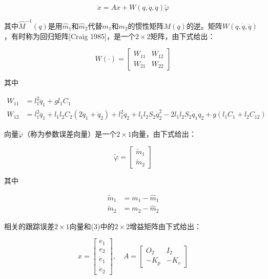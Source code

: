 \documentclass[12pt,a4paper]{ctexart}
\begin{document}
\begin{equation}
\dot{x} = Ax + W(q, \dot{q}, \ddot{q}) \tilde{\varphi}
\end{equation}

其中$\hat{M}^{-1}(q)$是用$\hat{m}_1$和$\hat{m}_2$代替$m_1$和$m_2$的惯性矩阵$M(q)$的逆。矩阵$W(q, \dot{q}, \ddot{q})$，有时称为回归矩阵[Craig 1985]，是一个$2 \times 2$矩阵，由下式给出：

\begin{equation}
W(\cdot) = \begin{bmatrix} W_{11} & W_{12} \\ W_{21} & W_{22} \end{bmatrix}
\end{equation}

其中

\begin{align}
W_{11} &= l_1^2 \ddot{q}_1 + g l_1 C_1 \\
W_{12} &= l_1^2 \ddot{q}_1 + l_1 l_2 C_2 (2\ddot{q}_1 + \ddot{q}_2) + l_1^2 \ddot{q}_2 + l_1 l_2 S_2 \dot{q}_2^2 - 2l_1 l_2 S_2 \dot{q}_1 \dot{q}_2 + g(l_1 C_1 + l_2 C_{12})
\end{align}

向量$\tilde{\varphi}$（称为参数误差向量）是一个$2 \times 1$向量，由下式给出：

\begin{equation}
\tilde{\varphi} = \begin{bmatrix} \tilde{m}_1 \\ \tilde{m}_2 \end{bmatrix}
\end{equation}

其中

\begin{align}
\tilde{m}_1 &= m_1 - \hat{m}_1 \\
\tilde{m}_2 &= m_2 - \hat{m}_2
\end{align}

相关的跟踪误差$2 \times 1$向量和(3)中的$2 \times 2$增益矩阵由下式给出：

\begin{equation}
x = \begin{bmatrix} e_1 \\ e_2 \\ \dot{e}_1 \\ \dot{e}_2 \end{bmatrix}, \quad A = \begin{bmatrix} O_2 & I_2 \\ -K_p & -K_v \end{bmatrix}
\end{equation}
\end{document}
